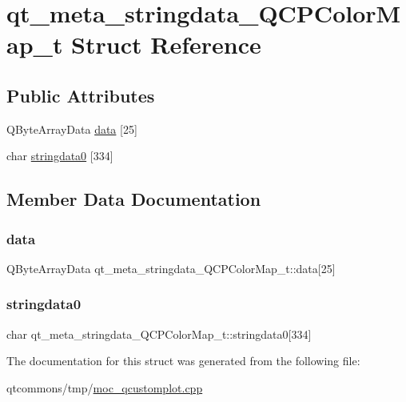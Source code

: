 \hypertarget{structqt__meta__stringdata___q_c_p_color_map__t}{}\section{qt\+\_\+meta\+\_\+stringdata\+\_\+\+Q\+C\+P\+Color\+Map\+\_\+t Struct Reference}
\label{structqt__meta__stringdata___q_c_p_color_map__t}
\subsection*{Public Attributes}
\begin{DoxyCompactItemize}
\item 
Q\+Byte\+Array\+Data \mbox{\hyperlink{structqt__meta__stringdata___q_c_p_color_map__t_accab0e8d36920ac71eecd79ccaa7badf}{data}} \mbox{[}25\mbox{]}
\item 
char \mbox{\hyperlink{structqt__meta__stringdata___q_c_p_color_map__t_a2edec26054af0f1b2cc81406b21fca92}{stringdata0}} \mbox{[}334\mbox{]}
\end{DoxyCompactItemize}


\subsection{Member Data Documentation}
\mbox{\label{structqt__meta__stringdata___q_c_p_color_map__t_accab0e8d36920ac71eecd79ccaa7badf}} 
\subsubsection{\texorpdfstring{data}{data}}
{\footnotesize\ttfamily Q\+Byte\+Array\+Data qt\+\_\+meta\+\_\+stringdata\+\_\+\+Q\+C\+P\+Color\+Map\+\_\+t\+::data\mbox{[}25\mbox{]}}

\mbox{\label{structqt__meta__stringdata___q_c_p_color_map__t_a2edec26054af0f1b2cc81406b21fca92}} 
\subsubsection{\texorpdfstring{stringdata0}{stringdata0}}
{\footnotesize\ttfamily char qt\+\_\+meta\+\_\+stringdata\+\_\+\+Q\+C\+P\+Color\+Map\+\_\+t\+::stringdata0\mbox{[}334\mbox{]}}



The documentation for this struct was generated from the following file\+:\begin{DoxyCompactItemize}
\item 
qtcommons/tmp/\mbox{\hyperlink{moc__qcustomplot_8cpp}{moc\+\_\+qcustomplot.\+cpp}}\end{DoxyCompactItemize}
